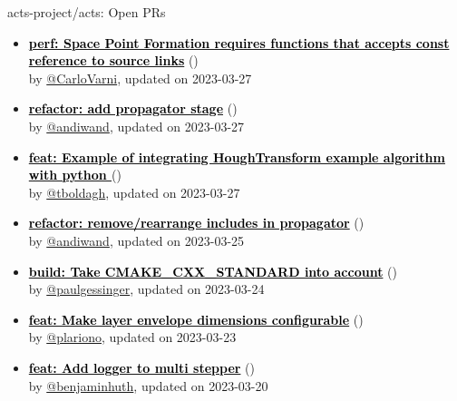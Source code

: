 \begin{frame}[allowframebreaks]{ acts-project/acts: Open PRs
}
\begin{itemize}
    \item\iss\textbf{\href{https://github.com/acts-project/acts/pull/1991}{\textcolor{black}{perf: Space Point Formation requires functions that accepts const reference to source links}}}
    (\href{https://github.com/acts-project/acts/pull/1991}{}) \\
    by \href{https://github.com/CarloVarni}{@CarloVarni}, updated on 2023-03-27

    \item\iss\textbf{\href{https://github.com/acts-project/acts/pull/1987}{\textcolor{black}{refactor: add propagator stage}}}
    (\href{https://github.com/acts-project/acts/pull/1987}{}) \\
    by \href{https://github.com/andiwand}{@andiwand}, updated on 2023-03-27

    \item\iss\textbf{\href{https://github.com/acts-project/acts/pull/1795}{\textcolor{black}{feat: Example of integrating HoughTransform example algorithm with python }}}
    (\href{https://github.com/acts-project/acts/pull/1795}{}) \\
    by \href{https://github.com/tboldagh}{@tboldagh}, updated on 2023-03-27

    \item\iss\textbf{\href{https://github.com/acts-project/acts/pull/1988}{\textcolor{black}{refactor: remove/rearrange includes in propagator}}}
    (\href{https://github.com/acts-project/acts/pull/1988}{}) \\
    by \href{https://github.com/andiwand}{@andiwand}, updated on 2023-03-25

    \item\iss\textbf{\href{https://github.com/acts-project/acts/pull/1981}{\textcolor{black}{build: Take CMAKE\_CXX\_STANDARD into account}}}
    (\href{https://github.com/acts-project/acts/pull/1981}{}) \\
    by \href{https://github.com/paulgessinger}{@paulgessinger}, updated on 2023-03-24

    \item\iss\textbf{\href{https://github.com/acts-project/acts/pull/1982}{\textcolor{black}{feat: Make layer envelope dimensions configurable}}}
    (\href{https://github.com/acts-project/acts/pull/1982}{}) \\
    by \href{https://github.com/plariono}{@plariono}, updated on 2023-03-23

    \item\iss\textbf{\href{https://github.com/acts-project/acts/pull/1964}{\textcolor{black}{feat: Add logger to multi stepper}}}
    (\href{https://github.com/acts-project/acts/pull/1964}{}) \\
    by \href{https://github.com/benjaminhuth}{@benjaminhuth}, updated on 2023-03-20


\end{itemize}
\end{frame}
